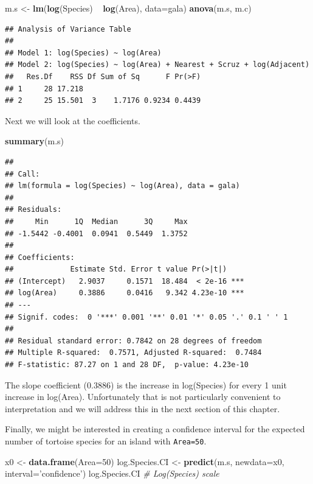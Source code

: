\documentclass[]{book}
\newenvironment{Shaded}{\begin{snugshade}}{\end{snugshade}}
\newcommand{\KeywordTok}[1]{\textcolor[rgb]{0.13,0.29,0.53}{\textbf{{#1}}}}
\newcommand{\DataTypeTok}[1]{\textcolor[rgb]{0.13,0.29,0.53}{{#1}}}
\newcommand{\DecValTok}[1]{\textcolor[rgb]{0.00,0.00,0.81}{{#1}}}
\newcommand{\StringTok}[1]{\textcolor[rgb]{0.31,0.60,0.02}{{#1}}}
\newcommand{\CommentTok}[1]{\textcolor[rgb]{0.56,0.35,0.01}{\textit{{#1}}}}
\newcommand{\NormalTok}[1]{{#1}}
\theoremstyle{definition}
\theoremstyle{definition}
\theoremstyle{remark}
\begin{document}
\begin{Shaded}
\begin{Highlighting}[]
\NormalTok{m.s <-}\StringTok{ }\KeywordTok{lm}\NormalTok{(}\KeywordTok{log}\NormalTok{(Species) ~}\StringTok{ }\KeywordTok{log}\NormalTok{(Area), }\DataTypeTok{data=}\NormalTok{gala)}
\KeywordTok{anova}\NormalTok{(m.s, m.c)}
\end{Highlighting}
\end{Shaded}

\begin{verbatim}
## Analysis of Variance Table
## 
## Model 1: log(Species) ~ log(Area)
## Model 2: log(Species) ~ log(Area) + Nearest + Scruz + log(Adjacent)
##   Res.Df    RSS Df Sum of Sq      F Pr(>F)
## 1     28 17.218                           
## 2     25 15.501  3    1.7176 0.9234 0.4439
\end{verbatim}

Next we will look at the coefficients.

\begin{Shaded}
\begin{Highlighting}[]
\KeywordTok{summary}\NormalTok{(m.s)}
\end{Highlighting}
\end{Shaded}

\begin{verbatim}
## 
## Call:
## lm(formula = log(Species) ~ log(Area), data = gala)
## 
## Residuals:
##     Min      1Q  Median      3Q     Max 
## -1.5442 -0.4001  0.0941  0.5449  1.3752 
## 
## Coefficients:
##             Estimate Std. Error t value Pr(>|t|)    
## (Intercept)   2.9037     0.1571  18.484  < 2e-16 ***
## log(Area)     0.3886     0.0416   9.342 4.23e-10 ***
## ---
## Signif. codes:  0 '***' 0.001 '**' 0.01 '*' 0.05 '.' 0.1 ' ' 1
## 
## Residual standard error: 0.7842 on 28 degrees of freedom
## Multiple R-squared:  0.7571, Adjusted R-squared:  0.7484 
## F-statistic: 87.27 on 1 and 28 DF,  p-value: 4.23e-10
\end{verbatim}

The slope coefficient (0.3886) is the increase in log(Species) for every
1 unit increase in log(Area). Unfortunately that is not particularly
convenient to interpretation and we will address this in the next
section of this chapter.

Finally, we might be interested in creating a confidence interval for
the expected number of tortoise species for an island with
\texttt{Area=50}.

\begin{Shaded}
\begin{Highlighting}[]
\NormalTok{x0 <-}\StringTok{ }\KeywordTok{data.frame}\NormalTok{(}\DataTypeTok{Area=}\DecValTok{50}\NormalTok{)}
\NormalTok{log.Species.CI <-}\StringTok{ }\KeywordTok{predict}\NormalTok{(m.s, }\DataTypeTok{newdata=}\NormalTok{x0, }\DataTypeTok{interval=}\StringTok{'confidence'}\NormalTok{)}
\NormalTok{log.Species.CI       }\CommentTok{# Log(Species) scale}
\end{Highlighting}
\end{Shaded}
\end{document}
